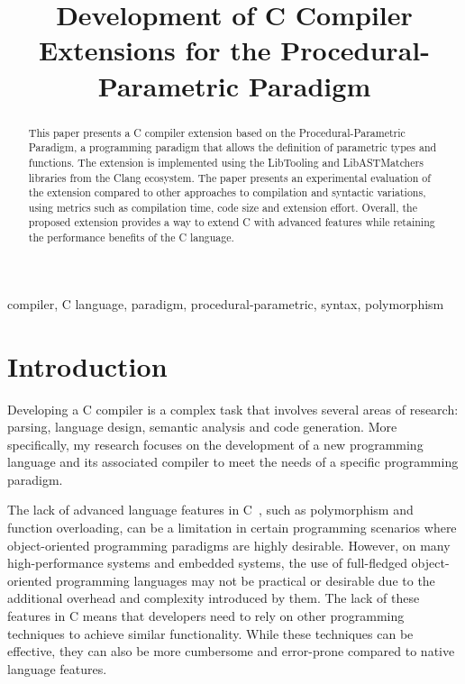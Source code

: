 \documentclass[conference]{IEEEtran}
\title{Development of C Compiler Extensions for the Procedural-Parametric Paradigm}
\author{
  \IEEEauthorblockN{\myname}
  \IEEEauthorblockA{\textit{Faculty of Computer Science, Department of Software Engineering} \\
  \textit{National Research University Higher School of Economics}\\
  Moscow, Russia \\
  \AA{AAAAAAAAAAAAAAAAAAAA}{8}}
}
\def\mykeywords{compiler, C language, paradigm, procedural-parametric, syntax, polymorphism}
\begin{document}
\maketitle

\begin{abstract}
  This paper presents a C compiler extension based on the Procedural-Parametric Paradigm, a programming paradigm that allows the definition of parametric types and functions.
  The extension is implemented using the LibTooling and LibASTMatchers libraries from the Clang ecosystem.
  The paper presents an experimental evaluation of the extension compared to other approaches to compilation and syntactic variations, using metrics such as compilation time, code size and extension effort.
  Overall, the proposed extension provides a way to extend C with advanced features while retaining the performance benefits of the C language.
\end{abstract}

\begin{IEEEkeywords}\mykeywords\end{IEEEkeywords}

\section{Introduction}

Developing a C compiler is a complex task that involves several areas of research:
parsing, language design, semantic analysis and code generation.
More specifically, my research focuses on the
development of a new programming language and its associated compiler to meet the needs of a specific programming paradigm.

The lack of advanced language features in C~\cite{kernighan1988c}, such as polymorphism and function overloading,
can be a limitation in certain programming scenarios where object-oriented programming paradigms are highly desirable.
However, on many high-performance systems and embedded systems, the use of full-fledged object-oriented programming languages
may not be practical or desirable due to the additional overhead and complexity introduced by them.
The lack of these features in C means that developers need to rely on other programming techniques to achieve similar functionality.
While these techniques can be effective, they can also be more cumbersome and error-prone compared to native language features.
\end{document}
